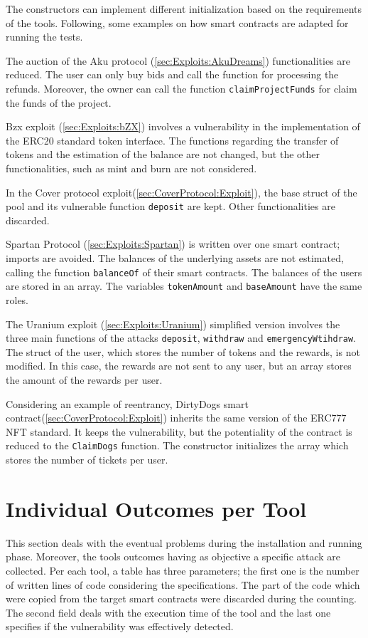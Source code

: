 The constructors can implement different initialization based on the requirements of the tools.
Following, some examples on how smart contracts are adapted for running the tests.

The auction of the Aku protocol (\autoref{sec:Exploits:AkuDreams}) functionalities are reduced.
The user can only buy bids and call the function for processing the refunds.
Moreover, the owner can call the function \texttt{claimProjectFunds} for claim the funds of the project.

Bzx exploit (\autoref*{sec:Exploits:bZX}) involves a vulnerability in the implementation of the ERC20 standard token interface.
The functions regarding the transfer of tokens and the estimation of the balance are not changed,
but the other functionalities, such as mint and burn are not considered.

In the Cover protocol exploit(\autoref{sec:CoverProtocol:Exploit}), the base struct of the pool and its vulnerable function \texttt{deposit} are kept.
Other functionalities are discarded.

Spartan Protocol (\autoref*{sec:Exploits:Spartan}) is written over one smart contract; imports are avoided.
The balances of the underlying assets are not estimated, calling the function \texttt{balanceOf} of their smart contracts.
The balances of the users are stored in an array.
The variables \texttt{tokenAmount} and \texttt{baseAmount} have the same roles.

The Uranium exploit (\autoref{sec:Exploits:Uranium}) simplified version involves the three main functions of the attacks
\texttt{deposit}, \texttt{withdraw} and \texttt{emergencyWtihdraw}.
The struct of the user, which stores the number of tokens and the rewards, is not modified.
In this case, the rewards are not sent to any user, but an array stores the amount of the rewards per user.


Considering an example of reentrancy, DirtyDogs smart contract(\autoref{sec:CoverProtocol:Exploit}) inherits the same version of the ERC777 NFT standard.
It keeps the vulnerability, but the potentiality of the contract is reduced to the \texttt{ClaimDogs} function.
The constructor initializes the array which stores the number of tickets per user.

\section{Individual Outcomes per Tool}
This section deals with the eventual problems during the installation and running phase.
Moreover, the tools outcomes having as objective a specific attack are collected.
Per each tool, a table has three parameters; the first one is the number of written lines of code considering the specifications.
The part of the code which were copied from the target smart contracts were discarded during the counting.
The second field deals with the execution time of the tool and the last one specifies if the vulnerability was effectively detected.

